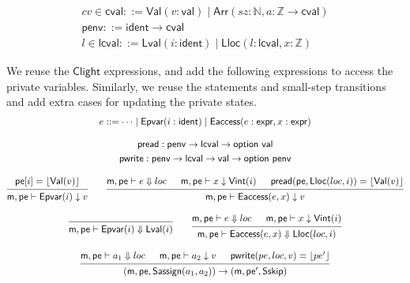 \documentclass[acmsmall,screen,review,anonymous]{acmart}
\newcommand{\kw}[1]{\ensuremath{ \mathsf{#1} }}
\newcommand{\Clight}{\ensuremath{ \mathsf{Clight} }}
\begin{document}
\begin{gather*}
  cv \in \kw{cval} \mathrel{::=} \kw{Val}(v:\kw{val})
                     \mathrel{|} \kw{Arr}(sz:\mathbb{N},a:\mathbb{Z} \rightarrow \kw{cval})
  \\
  \kw{penv} \mathrel{::=} \kw{ident} \rightarrow \kw{cval}
  \\
  l \in \kw{lcval} \mathrel{::=} \kw{Lval}(i: \kw{ident})
                          \mathrel{|} \kw{Lloc}(l:\kw{lcval}, x:\mathbb{Z})
\end{gather*}

We reuse the $\Clight$ expressions,
and add the following expressions to access the private variables.
Similarly, we reuse the statements and small-step transitions
and add extra cases for updating the private states.
\begin{gather*}
  e \mathrel{::=} \cdots \mathrel{|} \kw{Epvar}(i:\kw{ident})
  \mathrel{|} \kw{Eaccess}(e:\kw{expr}, x: \kw{expr})
  \\[2ex]
  \kw{pread} \mathrel{:} \kw{penv} \rightarrow \kw{lcval} \rightarrow \kw{option}\ \kw{val}\\
  \kw{pwrite} \mathrel{:} \kw{penv} \rightarrow \kw{lcval} \rightarrow \kw{val} \rightarrow \kw{option}\ \kw{penv}
  \\[2ex]
  {\begin{prooftree}
    \hypo{\kw{pe}[i] = \lfloor \kw{Val}(v) \rfloor }
    \infer1{\kw{m},\kw{pe} \vdash \kw{Epvar}(i) \downarrow v}
  \end{prooftree}}
  \qquad
  {\begin{prooftree}
    \hypo{\kw{m}, \kw{pe} \vdash e \Downarrow loc}
    \hypo{\kw{m},\kw{pe} \vdash x \downarrow \kw{Vint}(i)}
    \hypo{\kw{pread}(\kw{pe}, \kw{Lloc}(loc, i)) = \lfloor \kw{Val}(v) \rfloor }
    \infer3{\kw{m},\kw{pe} \vdash \kw{Eaccess}(e, x) \downarrow v}
  \end{prooftree}}
  \\[2ex]
  {\begin{prooftree}
    \infer0{\kw{m},\kw{pe} \vdash \kw{Epvar}(i) \Downarrow \kw{Lval}(i)}
  \end{prooftree}}
  \qquad
  {\begin{prooftree}
    \hypo{\kw{m},\kw{pe} \vdash e \Downarrow loc}
    \hypo{\kw{m},\kw{pe} \vdash x \downarrow \kw{Vint}(i)}
    \infer2{\kw{m}, \kw{pe} \vdash \kw{Eaccess}(e, x) \Downarrow \kw{Lloc}(loc, i)}
  \end{prooftree}}
  \\[2ex]
  {\begin{prooftree}
    \hypo{\kw{m}, \kw{pe} \vdash a_1 \Downarrow loc}
    \hypo{\kw{m}, \kw{pe} \vdash a_2 \downarrow v}
    \hypo{\kw{pwrite}(pe, loc, v) = \lfloor pe' \rfloor }
    \infer3{(\kw{m}, \kw{pe}, \kw{Sassign}(a_1, a_2)) \rightarrow
      (\kw{m}, \kw{pe'}, \kw{Sskip})}
  \end{prooftree}}
\end{gather*}
\end{document}
